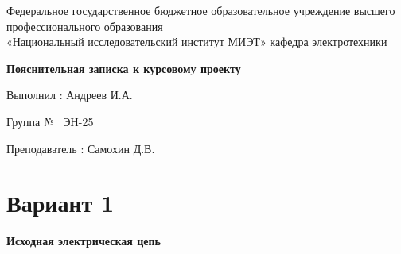\documentclass[12pt]{article}
\begin{document}

\begin{center}
	
Федеральное государственное бюджетное образовательное учреждение высшего\\
профессионального образования\\
«Национальный исследовательский институт МИЭТ»
\vskip2cm
кафедра электротехники
\vskip2cm
{
  \setlength{\parindent}{0pt}
  \linespread{1.5}\selectfont %
  \centering\titletimesnewroman\bfseries
  Пояснительная записка к курсовому проекту\par
  \titletimesnewroman\bfseries
  \par
  \par
}
\end{center}

\vskip8cm

{
  \linespread{1.1}\selectfont

  \noindent Выполнил : Андреев И.А. \par
  \noindent Группа №~ ЭН-25 \par
  \vskip0.5cm
  \noindent Преподаватель : Самохин Д.В.\par
}

\addtolength{\footskip}{-6mm}%
\thispagestyle{titlepage}

\clearpage
\addtolength{\footskip}{6mm}%

\section*{\centering Вариант 1}

{\centering\textbf{Исходная электрическая цепь}\par\vspace{0.5em}}
\end{document}
